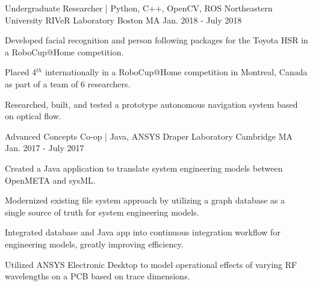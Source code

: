 \begin{cventries}
  \cventry
    {Undergraduate Researcher | Python, C++, OpenCV, ROS} %
    {Northeastern University RIVeR Laboratory} %
    {Boston MA} %
    {Jan. 2018 - July 2018} %
    {
      \begin{cvitems} %
        \item {Developed facial recognition and person following packages for the Toyota HSR in a RoboCup@Home competition.}
        \item {Placed 4$^{th}$ internationally in a RoboCup@Home competition in Montreal, Canada as part of a team of 6 researchers.}
        \item {Researched, built, and tested a prototype autonomous navigation system based on optical flow.}
      \end{cvitems}
    }

  \cventry
    {Advanced Concepts Co-op | Java, ANSYS} %
    {Draper Laboratory} %
    {Cambridge MA} %
    {Jan. 2017 - July 2017} %
    {
      \begin{cvitems} %
        \item {Created a Java application to translate system engineering models between OpenMETA and sysML.}
        \item {Modernized existing file system approach by utilizing a graph database as a single source of truth for system engineering models.}
        \item {Integrated database and Java app into continuous integration workflow for engineering models, greatly improving efficiency.}
        \item {Utilized ANSYS Electronic Desktop to model operational effects of varying RF wavelengths on a PCB based on trace dimensions.}
      \end{cvitems}
    }

\end{cventries}
